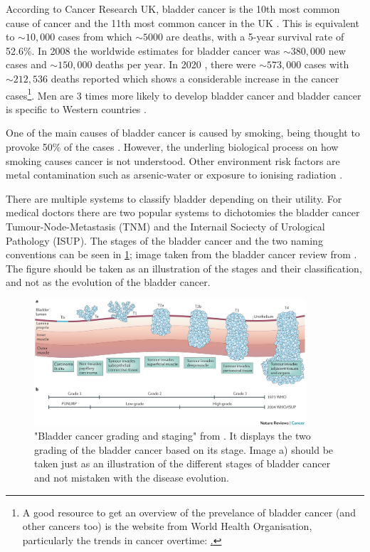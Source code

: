 According to Cancer Research UK, bladder cancer is the 10th most common cause of cancer and the 11th most common cancer in the UK \cite{Cancer_Research_UK2015-cf}. This is equivalent to $\sim10,000$ cases from which  $\sim5000$ are deaths, with a 5-year survival rate of 52.6\%. In 2008\cite{Ferlay2010-sx} the worldwide estimates for bladder cancer was $\sim380,000$ new cases and $\sim150,000$ deaths per year. In 2020\cite{Sung2021-hn} , there were $\sim573,000$ cases with $\sim212,536$ deaths reported which shows a considerable increase in the cancer cases\footnote{A good resource to get an overview of the prevelance of bladder cancer (and other cancers too) is the website from World Health Organisation, particularly the trends in cancer overtime: \href{https://gco.iarc.fr/en}.}. Men are 3 times more likely to develop bladder cancer and bladder cancer is specific to Western countries \cite{Knowles2015-mu}. 

One of the main causes of bladder cancer is caused by smoking, being thought to provoke 50\% of the cases \citet{Knowles2015-mu}. However, the underling biological process on how smoking causes cancer is not understood. Other environment risk factors are metal contamination such as arsenic-water or exposure to ionising radiation \citet{Knowles2015-mu}. 

There are multiple systems to classify bladder depending on their utility. For medical doctors there are two popular systems to dichotomies the bladder cancer Tumour-Node-Metastasis (TNM) and the Internail Sociecty of Urological Pathology (ISUP). The stages of the bladder cancer and the two naming conventions can be seen in \cref{fig:lit:bladder_cancer_stages}; image taken from the bladder cancer review from \citet{Knowles2015-mu}. The figure should be taken as an illustration of the stages and their classification, and not as the evolution of the bladder cancer.

\begin{figure}[!htb]    
    \centering
\includegraphics[width=0.9\textwidth,height=0.9\textheight,keepaspectratio]{Sections/Lit_review/Resources/bladder_cancer_grading.jpg}
    \caption{"Bladder cancer grading and staging" from \cite{Knowles2015-mu}. It displays the two grading of the bladder cancer based on its stage. Image a) should be taken just as an illustration of the different stages of bladder cancer and not mistaken with the disease evolution. }
    \label{fig:lit:bladder_cancer_stages}
\end{figure}


